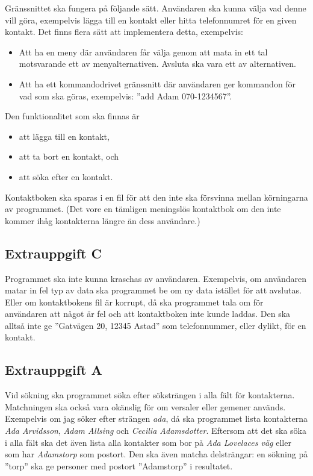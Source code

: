 \documentclass[a4paper]{miunasgn}
\begin{document}
Gränssnittet ska fungera på följande sätt.
Användaren ska kunna välja vad denne vill göra, exempelvis lägga till en 
kontakt eller hitta telefonnumret för en given kontakt.
Det finns flera sätt att implementera detta, exempelvis:
\begin{itemize}
	\item Att ha en meny där användaren får välja genom att mata in ett tal 
		motsvarande ett av menyalternativen.
		Avsluta ska vara ett av alternativen.
  \item Att ha ett kommandodrivet gränssnitt där användaren ger kommandon för 
    vad som ska göras, exempelvis: ''add Adam 070-1234567''.
\end{itemize}

Den funktionalitet som ska finnas är
\begin{itemize}
	\item att lägga till en kontakt,
  \item att ta bort en kontakt, och
	\item att söka efter en kontakt.
\end{itemize}

Kontaktboken ska sparas i en fil för att den inte ska försvinna mellan 
körningarna av programmet.
(Det vore en tämligen meningslös kontaktbok om den inte kommer ihåg kontakterna 
längre än dess användare.)

\subsection{Extrauppgift C}
\noindent
Programmet ska inte kunna kraschas av användaren.
Exempelvis, om användaren matar in fel typ av data ska programmet be om ny data 
istället för att avslutas.
Eller om kontaktbokens fil är korrupt, då ska programmet tala om för användaren 
att något är fel och att kontaktboken inte kunde laddas.
Den ska alltså inte ge ''Gatvägen 20, 12345 Astad'' som telefonnummer, eller 
dylikt, för en kontakt.

\subsection{Extrauppgift A}
\noindent
Vid sökning ska programmet söka efter söksträngen i alla fält för kontakterna.
Matchningen ska också vara okänslig för om versaler eller gemener används.
Exempelvis om jag söker efter strängen \emph{ada}, då ska programmet lista 
kontakterna \emph{Ada Arvidsson}, \emph{Adam Allsing} och \emph{Cecilia 
Adamsdotter}.
Eftersom att det ska söka i alla fält ska det även lista alla kontakter som bor 
på \emph{Ada Lovelaces väg} eller som har \emph{Adamstorp} som postort.
Den ska även matcha delsträngar: en sökning på ''torp'' ska ge personer med 
postort ''Adamstorp'' i resultatet.






%
\end{document}
